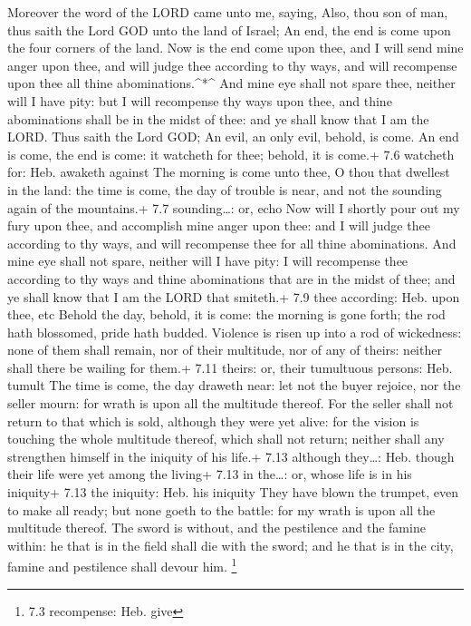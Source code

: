  Moreover the word of the LORD came unto me, saying,
 Also, thou son of man, thus saith the Lord GOD unto the
land of Israel; An end, the end is come upon the four corners of the
land.  Now is the end come upon thee, and I will send mine
anger upon thee, and will judge thee according to thy ways, and will
recompense upon thee all thine abominations.\^{}*\^{}  And
mine eye shall not spare thee, neither will I have pity: but I will
recompense thy ways upon thee, and thine abominations shall be in the
midst of thee: and ye shall know that I am the LORD.  Thus
saith the Lord GOD; An evil, an only evil, behold, is come. 
An end is come, the end is come: it watcheth for thee; behold, it is
come.+ 7.6 watcheth for: Heb. awaketh against  The morning
is come unto thee, O thou that dwellest in the land: the time is come,
the day of trouble is near, and not the sounding again of the
mountains.+ 7.7 sounding\ldots: or, echo  Now will I shortly
pour out my fury upon thee, and accomplish mine anger upon thee: and I
will judge thee according to thy ways, and will recompense thee for all
thine abominations.  And mine eye shall not spare, neither
will I have pity: I will recompense thee according to thy ways and thine
abominations that are in the midst of thee; and ye shall know that I am
the LORD that smiteth.+ 7.9 thee according: Heb. upon thee, etc
 Behold the day, behold, it is come: the morning is gone
forth; the rod hath blossomed, pride hath budded.  Violence
is risen up into a rod of wickedness: none of them shall remain, nor of
their multitude, nor of any of theirs: neither shall there be wailing
for them.+ 7.11 theirs: or, their tumultuous persons: Heb. tumult
 The time is come, the day draweth near: let not the buyer
rejoice, nor the seller mourn: for wrath is upon all the multitude
thereof.  For the seller shall not return to that which is
sold, although they were yet alive: for the vision is touching the whole
multitude thereof, which shall not return; neither shall any strengthen
himself in the iniquity of his life.+ 7.13 although they\ldots: Heb.
though their life were yet among the living+ 7.13 in the\ldots: or,
whose life is in his iniquity+ 7.13 the iniquity: Heb. his iniquity
 They have blown the trumpet, even to make all ready; but
none goeth to the battle: for my wrath is upon all the multitude
thereof.  The sword is without, and the pestilence and the
famine within: he that is in the field shall die with the sword; and he
that is in the city, famine and pestilence shall devour him. \footnote{7.3
  recompense: Heb. give}

